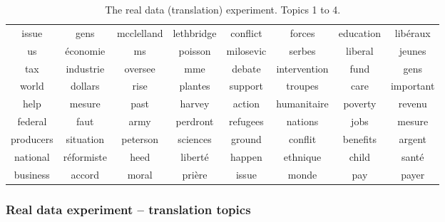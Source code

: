\documentclass{article}
\begin{document}
\begin{table*}
\begin{tabular}{cc|cc|cc|cc}
                 issue &                 gens &            mcclelland &           lethbridge &              conflict &               forces &             education &            lib\'eraux  \\ 
                    us &            \'economie &                    ms &              poisson &             milosevic &               serbes &               liberal &               jeunes  \\ 
                   tax &            industrie &               oversee &                  mme &                debate &         intervention &                  fund &                 gens  \\ 
                 world &              dollars &                  rise &              plantes &               support &              troupes &                  care &            important  \\ 
                  help &               mesure &                  past &               harvey &                action &          humanitaire &               poverty &               revenu  \\ 
               federal &                 faut &                  army &             perdront &              refugees &              nations &                  jobs &               mesure  \\ 
             producers &            situation &              peterson &             sciences &                ground &              conflit &              benefits &               argent  \\ 
              national &          r\'eformiste &                  heed &             libert\'e &                happen &             ethnique &                 child &               sant\'e  \\ 
              business &               accord &                 moral &              pri\`ere &                 issue &                monde &                   pay &                payer  \\ 
 \end{tabular}
 \vspace{-.5em}
\caption{ The real data (translation) experiment. Topics 1 to 4. \vspace{-1.5em}} 
\label{tab:1}
\end{table*}





\subsubsection{Real data experiment -- translation topics}
\label{app:translation}  
\end{document}
